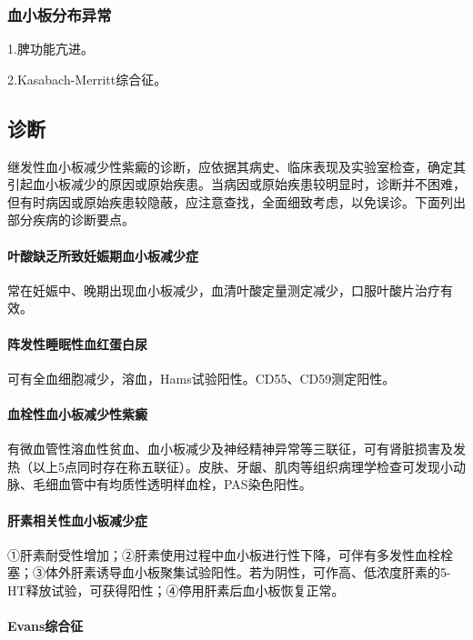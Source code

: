 \subsubsection{血小板分布异常}

1.脾功能亢进。

2.Kasabach-Merritt综合征。

\subsection{诊断}

继发性血小板减少性紫癜的诊断，应依据其病史、临床表现及实验室检查，确定其引起血小板减少的原因或原始疾患。当病因或原始疾患较明显时，诊断并不困难，但有时病因或原始疾患较隐蔽，应注意查找，全面细致考虑，以免误诊。下面列出部分疾病的诊断要点。

\paragraph{叶酸缺乏所致妊娠期血小板减少症}

常在妊娠中、晚期出现血小板减少，血清叶酸定量测定减少，口服叶酸片治疗有效。

\paragraph{阵发性睡眠性血红蛋白尿}

可有全血细胞减少，溶血，Hams试验阳性。CD55、CD59测定阳性。

\paragraph{血栓性血小板减少性紫癜}

有微血管性溶血性贫血、血小板减少及神经精神异常等三联征，可有肾脏损害及发热（以上5点同时存在称五联征）。皮肤、牙龈、肌肉等组织病理学检查可发现小动脉、毛细血管中有均质性透明样血栓，PAS染色阳性。

\paragraph{肝素相关性血小板减少症}

①肝素耐受性增加；②肝素使用过程中血小板进行性下降，可伴有多发性血栓栓塞；③体外肝素诱导血小板聚集试验阳性。若为阴性，可作高、低浓度肝素的5-HT释放试验，可获得阳性；④停用肝素后血小板恢复正常。

\paragraph{Evans综合征}

